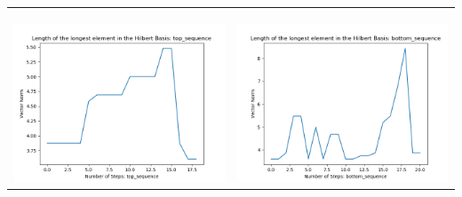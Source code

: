 \documentclass[10pt]{article}
\begin{document}
\begin{tabular}{c|c}
\begin{minipage}{.45\textwidth}
\end{minipage} \\ \\
\hline \\\begin{minipage}{.45\textwidth}
\includegraphics[width=\textwidth]{"DATA/4d/5 generators 2 bound A/top_sequence LENGTH"}
\end{minipage} &
\begin{minipage}{.45\textwidth}
\includegraphics[width=\textwidth]{"DATA/4d/5 generators 2 bound A bottomup/bottom_sequence LENGTH"}
\end{minipage}
\end{tabular}
\end{document}

